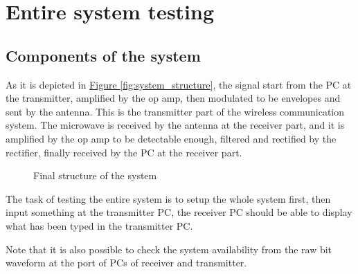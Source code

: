 \documentclass[12pt,a4paper]{report}
\begin{document}
\chapter{Entire system testing}
\section{Components of the system}
As it is depicted in \hyperref[fig:system_structure]{Figure \ref*{fig:system_structure}}, the signal start from the PC at the transmitter, amplified by the op amp, then modulated to be envelopes and sent by the antenna. This is the transmitter part of the wireless communication system. The microwave is received by the antenna at the receiver part, and it is amplified by the op amp to be detectable enough, filtered and rectified by the rectifier, finally received by the PC at the receiver part.

\begin{figure}[ht]
    
    \caption{Final structure of the system}
    \label{fig:final_structure}
\end{figure}

The task of testing the entire system is to setup the whole system first, then input something at the transmitter PC, the receiver PC should be able to display what has been typed in the transmitter PC.

Note that it is also possible to check the system availability from the raw bit waveform at the port of PCs of receiver and transmitter.
\end{document}
